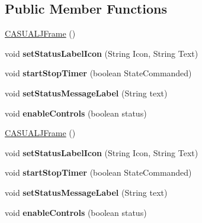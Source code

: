 \subsection*{Public Member Functions}
\begin{DoxyCompactItemize}
\item 
\hyperlink{classCASUAL_1_1CASUALJFrame_a75bc21e996105a528667cd5866789df6}{C\-A\-S\-U\-A\-L\-J\-Frame} ()
\item 
\hypertarget{classCASUAL_1_1CASUALJFrame_ab8c6685f91aed222205e96fbfe5f4e4a}{void {\bfseries set\-Status\-Label\-Icon} (String Icon, String Text)}\label{classCASUAL_1_1CASUALJFrame_ab8c6685f91aed222205e96fbfe5f4e4a}

\item 
\hypertarget{classCASUAL_1_1CASUALJFrame_a6df28504e65c9a926b89894d730a3e65}{void {\bfseries start\-Stop\-Timer} (boolean State\-Commanded)}\label{classCASUAL_1_1CASUALJFrame_a6df28504e65c9a926b89894d730a3e65}

\item 
\hypertarget{classCASUAL_1_1CASUALJFrame_a274d90b3b9a8d3e126896b6c0c356139}{void {\bfseries set\-Status\-Message\-Label} (String text)}\label{classCASUAL_1_1CASUALJFrame_a274d90b3b9a8d3e126896b6c0c356139}

\item 
\hypertarget{classCASUAL_1_1CASUALJFrame_a60805d1440958d7811bf18c921274695}{void {\bfseries enable\-Controls} (boolean status)}\label{classCASUAL_1_1CASUALJFrame_a60805d1440958d7811bf18c921274695}

\item 
\hyperlink{classCASUAL_1_1CASUALJFrame_a75bc21e996105a528667cd5866789df6}{C\-A\-S\-U\-A\-L\-J\-Frame} ()
\item 
\hypertarget{classCASUAL_1_1CASUALJFrame_ab8c6685f91aed222205e96fbfe5f4e4a}{void {\bfseries set\-Status\-Label\-Icon} (String Icon, String Text)}\label{classCASUAL_1_1CASUALJFrame_ab8c6685f91aed222205e96fbfe5f4e4a}

\item 
\hypertarget{classCASUAL_1_1CASUALJFrame_a6df28504e65c9a926b89894d730a3e65}{void {\bfseries start\-Stop\-Timer} (boolean State\-Commanded)}\label{classCASUAL_1_1CASUALJFrame_a6df28504e65c9a926b89894d730a3e65}

\item 
\hypertarget{classCASUAL_1_1CASUALJFrame_a274d90b3b9a8d3e126896b6c0c356139}{void {\bfseries set\-Status\-Message\-Label} (String text)}\label{classCASUAL_1_1CASUALJFrame_a274d90b3b9a8d3e126896b6c0c356139}

\item 
\hypertarget{classCASUAL_1_1CASUALJFrame_a60805d1440958d7811bf18c921274695}{void {\bfseries enable\-Controls} (boolean status)}\label{classCASUAL_1_1CASUALJFrame_a60805d1440958d7811bf18c921274695}

\end{DoxyCompactItemize}
